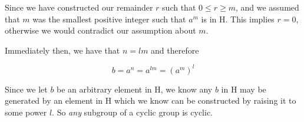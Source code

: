 \documentclass{article}
\begin{document}
Since we have constructed our remainder $r$ such that $0 \leq r \geq m$, and we assumed that $m$ was the smallest positive integer such that $a^m$ is in H. This implies $r = 0$, otherwise we would contradict our assumption about $m$.

Immediately then, we have that $n = lm$ and therefore

$$b = a^n = a^{lm} = \left(a^m\right)^l $$

Since we let $b$ be an arbitrary element in H, we know any $b$ in H may be generated by an element in H which we know can be constructed by raising it to some power $l$. So \textit{any} subgroup of a cyclic group is cyclic.
\end{document}
